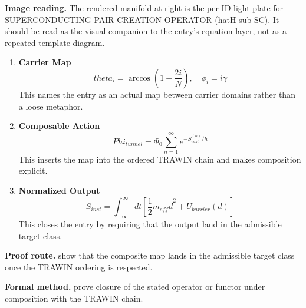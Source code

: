 \begin{samepage}
\noindent\begin{minipage}[t]{0.45\linewidth}
\vspace{0pt}
\raggedright
\scriptsize\textbf{Image reading.} The rendered manifold at right is the per-ID light plate for SUPERCONDUCTING PAIR CREATION OPERATOR (hatH sub SC). It should be read as the visual companion to the entry's equation layer, not as a repeated template diagram.\par
\end{minipage}\hfill
\begin{minipage}[t]{0.53\linewidth}
\vspace*{-0.10in}
\raggedright
{}
\end{minipage}
\end{samepage}

\clearpage


\begin{enumerate}[leftmargin=1.6em,itemsep=9pt,topsep=6pt]
\item \textbf{Carrier Map}
\[
theta_i = \arccos(1 - \frac{2i}{N}), \quad \phi_i = i\gamma
\]
This names the entry as an actual map between carrier domains rather than a loose metaphor.

\item \textbf{Composable Action}
\[
Phi_{tunnel} = \Phi_0 \sum_{n=1}^{\infty} e^{-S_{inst}^{(n)}/\hbar}
\]
This inserts the map into the ordered TRAWIN chain and makes composition explicit.

\item \textbf{Normalized Output}
\[
S_{inst} = \int_{-\infty}^{\infty} dt \left[\frac{1}{2}m_{eff}\dot{d}^2 + U_{barrier}(d)\right]
\]
This closes the entry by requiring that the output land in the admissible target class.
\end{enumerate}

\textbf{Proof route.} show that the composite map lands in the admissible target class once the TRAWIN ordering is respected.

\textbf{Formal method.} prove closure of the stated operator or functor under composition with the TRAWIN chain.

\medskip
{}

